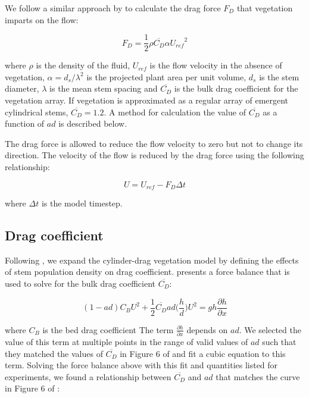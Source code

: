 \documentclass[10pt]{article}
\begin{document}
We follow a similar approach by \citet{kean2004flow} to calculate the drag force $F_D$ that vegetation imparts on the flow:

\begin{equation}
F_D = \frac{1}{2} \rho \overline{C_D} \alpha {U_{ref}}^2
\end{equation}

\noindent where $\rho$ is the density of the fluid, $U_{ref}$ is the flow velocity in the absence of vegetation, $\alpha=d_s/\lambda^2$ is the projected plant area per unit volume, $d_s$ is the stem diameter, $\lambda$ is the mean stem spacing and $\overline{C_D}$ is the bulk drag coefficient for the vegetation array. If vegetation is approximated as a regular array of emergent cylindrical stems, $\overline{C_D} = 1.2$. A method for calculation the value of $\overline{C_D}$ as a function of $ad$ is described below.

The drag force is allowed to reduce the flow velocity to zero but not to change its direction. The velocity of the flow is reduced by the drag force using the following relationship:

\begin{equation}
U = U_{ref} - F_D \Delta t
\end{equation}

\noindent where $\Delta t$ is the model timestep.

\subsection{Drag coefficient}

Following \citet{nepf1999drag}, we expand the cylinder-drag vegetation model by defining the effects of stem population density on drag coefficient. \citet{nepf1999drag} presents a force balance that is used to solve for the bulk drag coefficient $\overline{C_D}$:

\begin{equation}
(1 - a d) C_B U^2 + \frac{1}{2} \overline{C_D} a d \big(\frac{h}{d}\big) U^2 = g h \frac{\partial h}{\partial x}
\end{equation}

\noindent where $C_B$ is the bed drag coefficient The term $\frac{\partial h}{\partial x}$ depends on $a d$. We selected the value of this term at multiple points in the range of valid values of $a d$ such that they matched the values of $\overline{C_D}$ in Figure 6 of \citet{nepf1999drag} and fit a cubic equation to this term. Solving the force balance above with this fit and quantities listed for \citet{nepf1999drag} experiments, we found a relationship between $\overline{C_D}$ and $a d$ that matches the curve in Figure 6 of \citet{nepf1999drag}:
\end{document}
